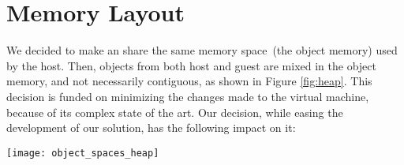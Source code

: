 
\section{Memory Layout} \label{sec:memory}

We decided to make an \objectspace share the same memory space~(the object memory) used by the host. Then, objects from both host and guest are mixed in the object memory, and not necessarily contiguous, as shown in Figure \ref{fig:heap}. This decision is funded on minimizing the changes made to the virtual machine, because of its complex state of the art. Our decision, while easing the development of our solution, has the following impact on it:

\begin{figure*}[htb]
\begin{center}
\texttt{[image: object\_spaces\_heap]}
\caption{Objects from the host and guest are mixed in the object memory. In this figure, after the ,  and  host instances, follow the corresponding ones of the guest, which can in order be followed by objects of the host, like the string \textbf{`hi'}. \label{fig:heap}}
\end{center}
\end{figure*}

